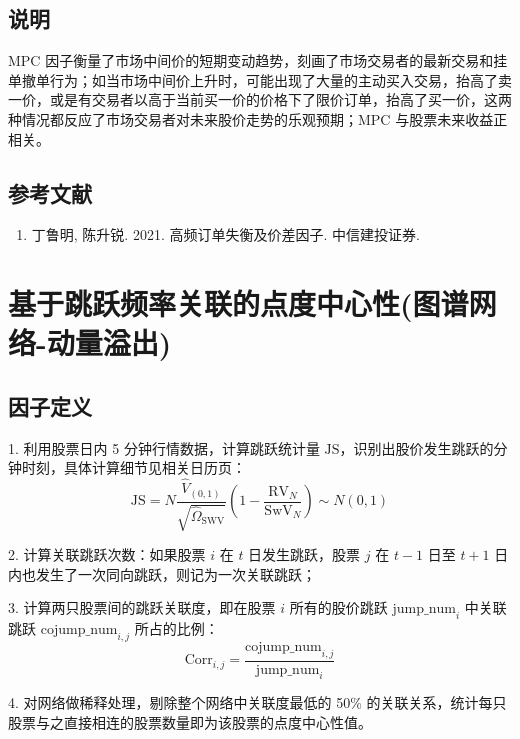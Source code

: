 \documentclass{article}
\begin{document}
\subsection{说明}
MPC 因子衡量了市场中间价的短期变动趋势，刻画了市场交易者的最新交易和挂单撤单行为；如当市场中间价上升时，可能出现了大量的主动买入交易，抬高了卖一价，或是有交易者以高于当前买一价的价格下了限价订单，抬高了买一价，这两种情况都反应了市场交易者对未来股价走势的乐观预期；MPC 与股票未来收益正相关。

\subsection{参考文献}
\begin{enumerate}
    \item 丁鲁明, 陈升锐. 2021. 高频订单失衡及价差因子. 中信建投证券.
\end{enumerate}

\section{基于跳跃频率关联的点度中心性(图谱网络-动量溢出)}

\subsection{因子定义}

1. 利用股票日内 5 分钟行情数据，计算跳跃统计量 \( \mathrm{JS} \)，识别出股价发生跳跃的分钟时刻，具体计算细节见相关日历页：
\begin{equation}
    \mathrm{JS} = N \frac{\hat{V}_{(0,1)}}{\sqrt{\hat{\Omega}_{\mathrm{SWV}}}} \left( 1 - \frac{\mathrm{RV}_N}{\mathrm{SwV}_N} \right) \sim N(0,1)
\end{equation}

2. 计算关联跳跃次数：如果股票 \( i \) 在 \( t \) 日发生跳跃，股票 \( j \) 在 \( t-1 \) 日至 \( t+1 \) 日内也发生了一次同向跳跃，则记为一次关联跳跃；

3. 计算两只股票间的跳跃关联度，即在股票 \( i \) 所有的股价跳跃 \( \mathrm{jump\_num}_i \) 中关联跳跃 \( \mathrm{cojump\_num}_{i,j} \) 所占的比例：
\begin{equation}
    \mathrm{Corr}_{i,j} = \frac{\mathrm{cojump\_num}_{i,j}}{\mathrm{jump\_num}_i}
\end{equation}

4. 对网络做稀释处理，剔除整个网络中关联度最低的 50\% 的关联关系，统计每只股票与之直接相连的股票数量即为该股票的点度中心性值。
\end{document}
